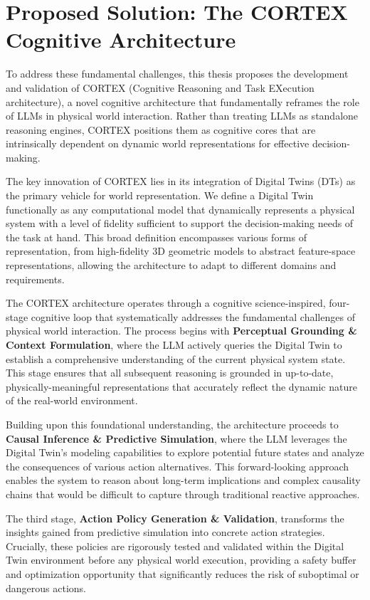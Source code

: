\section{Proposed Solution: The CORTEX Cognitive Architecture}

To address these fundamental challenges, this thesis proposes the development and validation of CORTEX (Cognitive Reasoning and Task EXecution architecture), a novel cognitive architecture that fundamentally reframes the role of LLMs in physical world interaction. Rather than treating LLMs as standalone reasoning engines, CORTEX positions them as cognitive cores that are intrinsically dependent on dynamic world representations for effective decision-making.

The key innovation of CORTEX lies in its integration of Digital Twins (DTs) as the primary vehicle for world representation. We define a Digital Twin functionally as any computational model that dynamically represents a physical system with a level of fidelity sufficient to support the decision-making needs of the task at hand. This broad definition encompasses various forms of representation, from high-fidelity 3D geometric models to abstract feature-space representations, allowing the architecture to adapt to different domains and requirements.

The CORTEX architecture operates through a cognitive science-inspired, four-stage cognitive loop that systematically addresses the fundamental challenges of physical world interaction. The process begins with \textbf{Perceptual Grounding \& Context Formulation}, where the LLM actively queries the Digital Twin to establish a comprehensive understanding of the current physical system state. This stage ensures that all subsequent reasoning is grounded in up-to-date, physically-meaningful representations that accurately reflect the dynamic nature of the real-world environment.

Building upon this foundational understanding, the architecture proceeds to \textbf{Causal Inference \& Predictive Simulation}, where the LLM leverages the Digital Twin's modeling capabilities to explore potential future states and analyze the consequences of various action alternatives. This forward-looking approach enables the system to reason about long-term implications and complex causality chains that would be difficult to capture through traditional reactive approaches.

The third stage, \textbf{Action Policy Generation \& Validation}, transforms the insights gained from predictive simulation into concrete action strategies. Crucially, these policies are rigorously tested and validated within the Digital Twin environment before any physical world execution, providing a safety buffer and optimization opportunity that significantly reduces the risk of suboptimal or dangerous actions.

